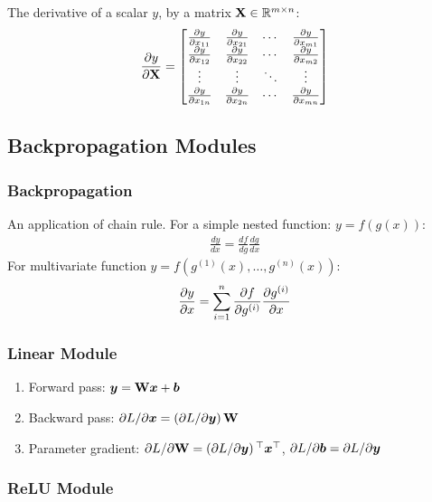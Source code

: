 The derivative of a scalar $y$, by a matrix $\mathbf{X}\in\mathbb{R}^{m\times n}$:
\begin{align*}
	\frac{\partial y}{\partial\mathbf{X}}=\begin{bmatrix}
	\frac{\partial y}{\partial x_{11}}&\frac{\partial y}{\partial x_{21}}&\cdots&\frac{\partial y}{\partial x_{m1}} \\
	\frac{\partial y}{\partial x_{12}}&\frac{\partial y}{\partial x_{22}}&\cdots&\frac{\partial y}{\partial x_{m2}} \\
	\vdots&\vdots&\ddots&\vdots \\
	\frac{\partial y}{\partial x_{1n}}&\frac{\partial y}{\partial x_{2n}}&\cdots&\frac{\partial y}{\partial x_{mn}}
\end{bmatrix}
\end{align*}

\subsection{Backpropagation Modules}

\subsubsection*{Backpropagation}

An application of chain rule. For a simple nested function: $y=f(g(x))$:
\begin{align*}
	\frac{dy}{dx}=\frac{df}{dg}\frac{dg}{dx}
\end{align*}
For multivariate function $y=f\left(g^{(1)}(x),\dotsc,g^{(n)}(x)\right)$:
\begin{align*}
	\frac{\partial y}{\partial x}=\sum_{i=1}^n\frac{\partial f}{\partial g^{(i)}}\frac{\partial g^{(i)}}{\partial x}
\end{align*}

\subsubsection*{Linear Module}

\begin{enumerate}
	\item Forward pass: $\boldsymbol{y}=\mathbf{W}\boldsymbol{x}+\boldsymbol{b}$
	\item Backward pass: $\partial L/\partial\boldsymbol{x}=\left(\partial L/\partial\boldsymbol{y}\right)\mathbf{W}$
	\item Parameter gradient: $\partial L/\partial\mathbf{W}=\left(\partial L/\partial\boldsymbol{y}\right){}^\top\boldsymbol{x}{}^\top$, $\partial L/\partial\boldsymbol{b}=\partial L/\partial\boldsymbol{y}$
\end{enumerate}

\subsubsection*{ReLU Module}

